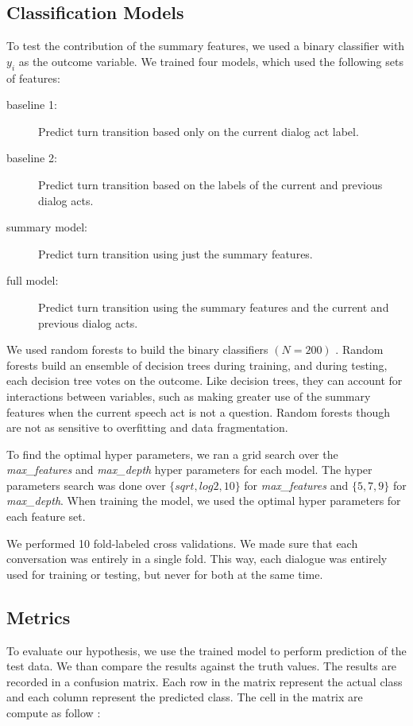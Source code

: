 \subsection{Classification Models}

    To test the contribution of the summary features, we used a binary classifier with
    $y_i$ as the outcome variable. We trained four models, which used the following sets of features:

    \begin{description}
        \item[baseline 1:] Predict turn transition based only on the current dialog act label.
        \item[baseline 2:] Predict turn transition based on the labels of the current and previous dialog acts.
        \item[summary model:] Predict turn transition using just the summary features.
        \item[full model:] Predict turn transition using the summary features and the current and previous dialog acts.
    \end{description}


We used random forests to build the binary classifiers $(N=200)$ \cite{Breiman01randomforests}. Random forests build an ensemble of decision trees during training, and during testing, each decision tree votes on the outcome.  Like decision trees, they can account for interactions between variables, such as making greater use of the summary features when the current speech act is not a question.  Random forests though are not as sensitive to overfitting and data fragmentation.

To find the optimal hyper parameters, we ran a grid search over the \textit{max\_features} and \textit{max\_depth} hyper parameters for each model. The hyper parameters search was done over $\{sqrt, log2, 10\}$ for \textit{max\_features} and $\{5, 7, 9\}$ for \textit{max\_depth}. When training the model, we used the optimal hyper parameters for each feature set.

We performed 10 fold-labeled cross validations.  We made sure that each conversation was entirely in a single fold. This way, each dialogue was entirely used for training or testing, but never for both at the same time.

\subsection{Metrics}
To evaluate our hypothesis, we use the trained model to perform prediction of the test data. We than compare the results against the truth values. The results are recorded in a confusion matrix.
Each row in the matrix represent the actual class and each column represent the predicted class.
The cell in the matrix are compute as follow :

